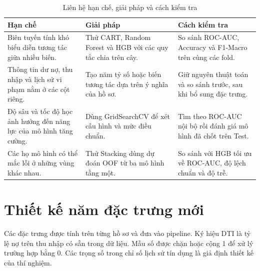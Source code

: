\documentclass[12pt,a4paper,oneside]{report}
\begin{document}
\begin{table}[H]
  \caption{Liên hệ hạn chế, giải pháp và cách kiểm tra}
  \label{tab:solutions}
  \begin{tabularx}{\textwidth}{|>{\raggedright\arraybackslash}p{4cm}|>{\raggedright\arraybackslash}X|>{\raggedright\arraybackslash}X|}
    \hline
    \textbf{Hạn chế} & \textbf{Giải pháp} & \textbf{Cách kiểm tra} \\
    \hline
    Biên tuyến tính khó biểu diễn tương tác giữa nhiều biến. &
    Thử CART, Random Forest và HGB với các quy tắc chia trên cây. &
    So sánh ROC-AUC, Accuracy và F1-Macro trên cùng các fold. \\ \hline
    Thông tin dư nợ, thu nhập và lịch sử vi phạm nằm ở các cột riêng. &
    Tạo năm tỷ số hoặc biến tương tác dựa trên ý nghĩa của hồ sơ. &
    Giữ nguyên thuật toán và so sánh trước, sau khi bổ sung đặc trưng. \\ \hline
    Độ sâu và tốc độ học ảnh hưởng đến năng lực của mô hình tăng cường. &
    Dùng GridSearchCV để xét cấu hình và mức điều chuẩn. &
    Tìm theo ROC-AUC nội bộ rồi đánh giá mô hình đã chốt trên Test. \\ \hline
    Các họ mô hình có thể mắc lỗi ở những vùng khác nhau. &
    Thử Stacking dùng dự đoán OOF từ ba mô hình tầng một. &
    So sánh với HGB tối ưu về ROC-AUC, độ lệch chuẩn và độ trễ. \\ \hline
  \end{tabularx}
\end{table}

\section{Thiết kế năm đặc trưng mới}

Các đặc trưng được tính trên từng hồ sơ và đưa vào pipeline. Ký hiệu DTI là tỷ lệ nợ trên thu nhập có sẵn trong dữ liệu. Mẫu số được chặn hoặc cộng 1 để xử lý trường hợp bằng 0. Các trọng số trong chỉ số lịch sử tín dụng là giả định thiết kế của thí nghiệm.
\end{document}

